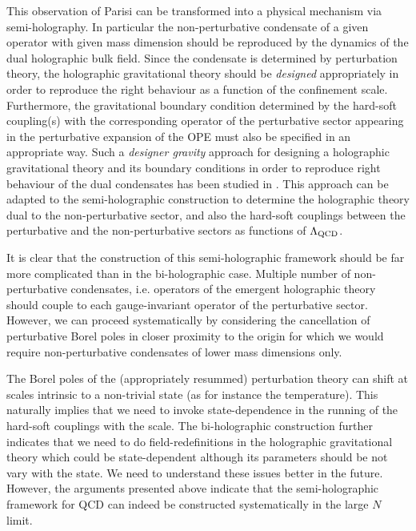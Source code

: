 \documentclass[prd,reprint,a4paper,showpacs,superscriptaddress,11pt,onecolumn,nofootinbib]{revtex4-1}
\renewcommand{\(}{\left(}
\renewcommand{\)}{\right)}
\newcommand{\6}{\partial}
\begin{document}
This observation of Parisi can be transformed into a physical mechanism via semi-holography. In particular the non-perturbative condensate of a given operator with  given mass dimension should be reproduced by the dynamics of the dual holographic bulk field. Since the condensate is determined by perturbation theory, the holographic gravitational theory should be \textit{designed} appropriately in order to reproduce the right behaviour as a function of the confinement scale. Furthermore, the gravitational boundary condition determined by the hard-soft coupling(s) with the corresponding operator of the perturbative sector appearing in the perturbative expansion of the OPE must also be specified in an appropriate way. Such a \textit{designer gravity} approach for designing a holographic gravitational theory and its boundary conditions in order to reproduce right behaviour of the dual condensates has been studied in \cite{Hertog:2004ns,Gubser:2008yx,Gursoy:2008za}.  This approach can be adapted to the semi-holographic construction to determine the holographic theory dual to the non-perturbative sector, and also the hard-soft couplings between the perturbative and the non-perturbative sectors as functions of $\Lambda_{\rm QCD}$.

It is clear that the construction of this semi-holographic framework should be far more complicated than in the bi-holographic case. Multiple number of non-perturbative condensates, i.e. operators of the emergent holographic theory should couple to each gauge-invariant operator of the perturbative sector. However, we can proceed systematically by considering the cancellation of perturbative Borel poles in closer proximity to the origin for which we would require non-perturbative condensates of lower mass dimensions only.

The Borel poles of the (appropriately resummed) perturbation theory can shift at scales intrinsic to a non-trivial state (as for instance the temperature). This naturally implies that we need to invoke state-dependence in the running of the hard-soft couplings with the scale. The bi-holographic construction further indicates that we need to do field-redefinitions in the holographic gravitational theory which could be state-dependent although its parameters should be not vary with the state. We need to understand these issues better in the future. However, the arguments presented above indicate that the semi-holographic framework for QCD can indeed be constructed systematically in the large $N$ limit.
\end{document}
